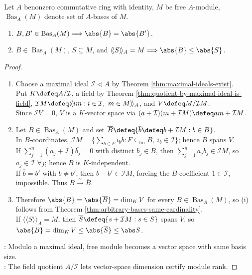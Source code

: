 \begin{theorem} \label{thm:free-module-rank-well-defined-commutative} \\
Let $A$ benonzero commutative ring with identity, $M$ be free $A$-module, $\operatorname{Bas}_A(M)$ denote set of $A$-bases of $M$.
\begin{enumerate}[label=(\roman*)]
\setlength{\itemsep}{0pt}
\item $B,B'\in\operatorname{Bas}_A(M)\Longrightarrow\abs{B}=\abs{B'}$.
\item $B\in\operatorname{Bas}_A(M)$, $S\subseteq M$, and $\langle\!\langle S\rangle\!\rangle_A=M\Longrightarrow\abs{B}\leq\abs{S}$.
\end{enumerate}
\begin{proof}
\begin{enumerate}[label=(\roman*)]
\setlength{\itemsep}{0pt}
\item Choose a maximal ideal $\mathcal{I}\lhd A$ by Theorem \ref{thm:maximal-ideals-exist}.\\
Put $K\defeq A/\mathcal{I}$, a field by Theorem \ref{thm:quotient-by-maximal-ideal-is-field}, $\mathcal{I}M\defeq\langle\!\langle im:i\in\mathcal{I},\ m\in M\rangle\!\rangle_A$, and $V\defeq M/\mathcal{I}M$.\\
Since $\mathcal{I}V=0$, $V$ is a $K$-vector space via $(a+\mathcal{I})(m+\mathcal{I}M)\defeq am+\mathcal{I}M$.
\item Let $B\in\operatorname{Bas}_A(M)$ and set $\overline{B}\defeq\{\overline{b}\defeq b+\mathcal{I}M:b\in B\}$.\\
In $B$-coordinates, $\mathcal{I}M=\{\sum\limits_{b\in F}i_bb:F\subseteq_{\operatorname{fin}}B,\ i_b\in\mathcal{I}\}$; hence $\overline{B}$ spans $V$.\\
If $\sum\limits_{j=1}^n(a_j+\mathcal{I})\overline{b_j}=0$ with distinct $b_j\in B$, then $\sum\limits_{j=1}^na_jb_j\in\mathcal{I}M$, so $a_j\in\mathcal{I}$ $\forall j$; hence $\overline{B}$ is $K$-independent.\\
If $\overline b=\overline{b'}$ with $b\neq b'$, then $b-b'\in\mathcal{I}M$, forcing the $B$-coefficient $1\in\mathcal{I}$, impossible. Thus $B\xrightarrow{\sim}\overline B$.
\item Therefore $\abs{B}=\abs{\overline B}=\dim_K V$ for every $B\in\operatorname{Bas}_A(M)$, so (i) follows from Theorem \ref{thm:arbitrary-bases-same-cardinality}.\\
If $\langle\!\langle S\rangle\!\rangle_A=M$, then $\overline S\defeq\{s+\mathcal{I}M:s\in S\}$ spans $V$, so $\abs{B}=\dim_K V\leq\abs{\overline S}\leq\abs S$.
\end{enumerate}
: Modulo a maximal ideal, free module becomes a vector space with same basis size.\\
: The field quotient $A/\mathcal{I}$ lets vector-space dimension certify module rank.
\end{proof}
\end{theorem}

